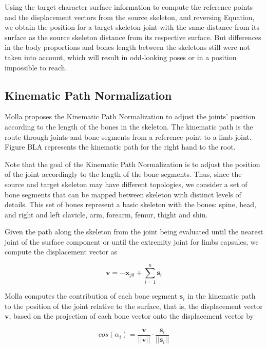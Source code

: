 \documentclass{vgtc}
\begin{document}
Using the target character surface information to compute the reference
points and the displacement vectors from the source skeleton, and
reversing Equation, we obtain the position for a target skeleton joint
with the same distance from its surface as the source skeleton distance
from its respective surface. But differences in the body proportions and
bones length between the skeletons still were not taken into account,
which will result in odd-looking poses or in a position impossible to
reach.


    \subsection{Kinematic Path
Normalization}\label{kinematic-path-normalization}

Molla proposes the Kinematic Path Normalization to adjust the joints'
position according to the length of the bones in the skeleton. The
kinematic path is the route through joints and bone segments from a
reference point to a limb joint. Figure BLA represents the kinematic
path for the right hand to the root.

Note that the goal of the Kinematic Path Normalization is to adjust the
position of the joint accordingly to the length of the bone segments.
Thus, since the source and target skeleton may have different
topologies, we consider a set of bone segments that can be mapped
between skeleton with distinct levels of details. This set of bones
represent a basic skeleton with the bones: spine, head, and right and
left clavicle, arm, forearm, femur, thight and shin.

Given the path along the skeleton from the joint being evaluated until
the nearest joint of the surface component or until the extremity joint
for limbs capsules, we compute the displacement vector as

\begin{equation}
\label{eq:dispvector}
\mathbf{v} = \mathbf{-x}_{j0} + \sum_{i=1}^{n} \mathbf{s}_i
\end{equation}

Molla computes the contribution of each bone segment \(\mathbf{s}_i\) in
the kinematic path to the position of the joint relative to the surface,
that is, the displacement vector \(\mathbf{v}\), based on the projection
of each bone vector onto the displacement vector by

\begin{equation}
\label{eq:contribution}
cos(\alpha_{i}) = \frac{\mathbf{v}}{||\mathbf{v}||}\cdot\frac{\mathbf{s}_{i}}{||\mathbf{s}_{i}||}
\end{equation}
\end{document}
